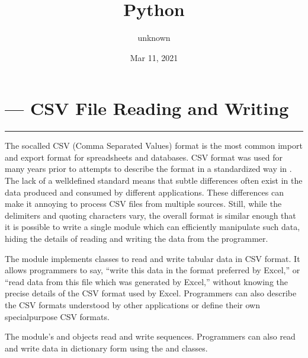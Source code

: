 \documentclass[letterpaper,10pt,english]{sphinxmanual}
\title{Python}
\date{Mar 11, 2021}
\author{unknown}
\begin{document}
\pagestyle{empty}
\sphinxmaketitle
\pagestyle{plain}
\sphinxtableofcontents
\pagestyle{normal}
\label{\detokenize{index::doc}}



\chapter{ — CSV File Reading and Writing}
\label{\detokenize{csv:module-csv}}\label{\detokenize{csv:csv-csv-file-reading-and-writing}}\label{\detokenize{csv::doc}}
\ignorespaces

\bigskip\hrule\bigskip


The so\sphinxhyphen{}called CSV (Comma Separated Values) format is the most common import and
export format for spreadsheets and databases.  CSV format was used for many
years prior to attempts to describe the format in a standardized way in
.  The lack of a well\sphinxhyphen{}defined standard means that subtle differences
often exist in the data produced and consumed by different applications.  These
differences can make it annoying to process CSV files from multiple sources.
Still, while the delimiters and quoting characters vary, the overall format is
similar enough that it is possible to write a single module which can
efficiently manipulate such data, hiding the details of reading and writing the
data from the programmer.

The {\hyperref[\detokenize{csv:module-csv}]{}} module implements classes to read and write tabular data in CSV
format.  It allows programmers to say, “write this data in the format preferred
by Excel,” or “read data from this file which was generated by Excel,” without
knowing the precise details of the CSV format used by Excel.  Programmers can
also describe the CSV formats understood by other applications or define their
own special\sphinxhyphen{}purpose CSV formats.

The {\hyperref[\detokenize{csv:module-csv}]{}} module’s {\hyperref[\detokenize{csv:csv.reader}]{}} and {\hyperref[\detokenize{csv:csv.writer}]{}} objects read and
write sequences.  Programmers can also read and write data in dictionary form
using the {\hyperref[\detokenize{csv:csv.DictReader}]{}} and {\hyperref[\detokenize{csv:csv.DictWriter}]{}} classes.
\end{document}

